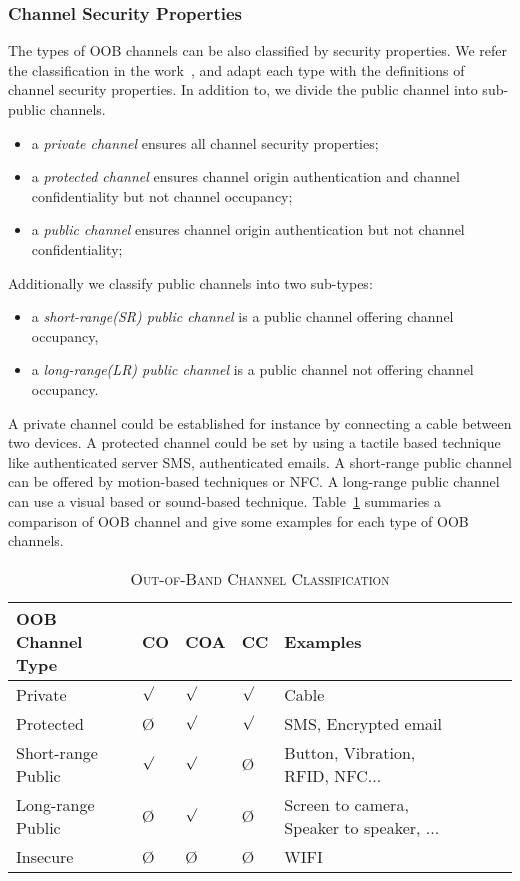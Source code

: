 \subsubsection{Channel Security Properties}

The types of OOB channels can be also classified by security properties. We refer the classification in the work~\cite{6687314}, and adapt each type with the definitions of channel security properties. In addition to, we divide the public channel into sub-public channels. 
\begin{itemize}
 \item a \textit{private channel} ensures all channel security properties;
 \item a \textit{protected channel} ensures channel origin authentication and channel confidentiality but not channel occupancy;
 \item a \textit{public channel} ensures channel origin authentication but not channel confidentiality;
\end{itemize}

Additionally we classify public channels into two sub-types: 
\begin{itemize}
 \item a \textit{short-range(SR) public channel} is a public channel offering channel occupancy,
 \item a \textit{long-range(LR) public channel} is a public channel not offering channel occupancy.
\end{itemize}

A private channel could be established for instance by connecting a cable between two devices. A protected channel could be set by using a tactile based technique like authenticated server SMS, authenticated emails. A short-range public channel can be offered by motion-based techniques or NFC. A long-range public channel can use a visual based or sound-based technique. Table~\ref{tableproperties} summaries a comparison of OOB channel and give some examples for each type of OOB channels.

\begin{table}
\centering
\caption{\textsc{Out-of-Band Channel Classification}}
\label{tableproperties}
{\scriptsize
\begin{tabular}{ l l l l l l l l | }
\hline
OOB Channel Type & CO & COA & CC & Examples \\
\hline\hline
Private & $\surd$ & $\surd$ & $\surd$ & Cable \\ \hline
Protected & \O & $\surd$ & $\surd$ & SMS, Encrypted email \\ \hline
Short-range Public & $\surd$ & $\surd$ & \O & Button, Vibration, RFID, NFC... \\ \hline
Long-range Public & \O & $\surd$& \O & Screen to camera, Speaker to speaker, ... \\ \hline
Insecure & \O & \O & \O & WIFI \\ 
\end{tabular}
}
\end{table}


